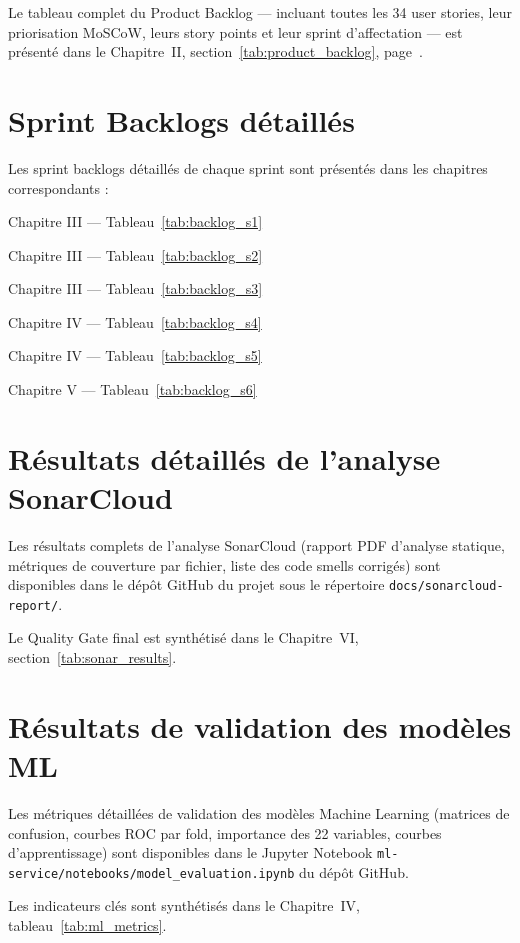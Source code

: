 Le tableau complet du Product Backlog — incluant toutes les 34 user stories,
leur priorisation MoSCoW, leurs story points et leur sprint d'affectation —
est présenté dans le Chapitre~II, section~\ref{tab:product_backlog},
page~\pageref{tab:product_backlog}.

\chapter{Sprint Backlogs détaillés}
\label{ann:sprint_backlogs}

Les sprint backlogs détaillés de chaque sprint sont présentés dans les chapitres
correspondants :

\begin{description}[leftmargin=3cm]
  \item[Sprint 1] Chapitre III — Tableau~\ref{tab:backlog_s1}
  \item[Sprint 2] Chapitre III — Tableau~\ref{tab:backlog_s2}
  \item[Sprint 3] Chapitre III — Tableau~\ref{tab:backlog_s3}
  \item[Sprint 4] Chapitre IV — Tableau~\ref{tab:backlog_s4}
  \item[Sprint 5] Chapitre IV — Tableau~\ref{tab:backlog_s5}
  \item[Sprint 6] Chapitre V — Tableau~\ref{tab:backlog_s6}
\end{description}

\chapter{Résultats détaillés de l'analyse SonarCloud}
\label{ann:sonarcloud}

Les résultats complets de l'analyse SonarCloud (rapport PDF d'analyse statique,
métriques de couverture par fichier, liste des code smells corrigés) sont
disponibles dans le dépôt GitHub du projet sous le répertoire
\texttt{docs/sonarcloud-report/}.

Le Quality Gate final est synthétisé dans le Chapitre~VI,
section~\ref{tab:sonar_results}.

\chapter{Résultats de validation des modèles ML}
\label{ann:ml_validation}

Les métriques détaillées de validation des modèles Machine Learning (matrices de
confusion, courbes ROC par fold, importance des 22 variables, courbes
d'apprentissage) sont disponibles dans le Jupyter Notebook
\texttt{ml-service/notebooks/model\_evaluation.ipynb} du dépôt GitHub.

Les indicateurs clés sont synthétisés dans le Chapitre~IV,
tableau~\ref{tab:ml_metrics}.
